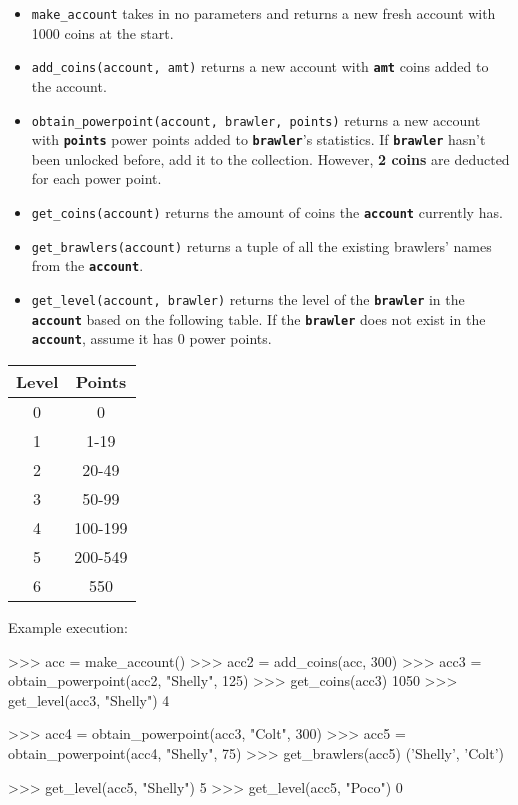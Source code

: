 \begin{itemize}
\item \colorbox{CornflowerBlue!20}{\texttt{make\_account}} takes in no parameters and returns a new fresh account with 1000 coins at the start.
\item \colorbox{CornflowerBlue!20}{\texttt{add\_coins(account, amt)}} returns a new account with \texttt{\bfseries amt} coins added to the account.
\item \colorbox{CornflowerBlue!20}{\texttt{obtain\_powerpoint(account, brawler, points)}} returns a new account with \texttt{\bfseries points} power 
points added to \texttt{\bfseries brawler}'s statistics. If \texttt{\bfseries brawler} hasn't been unlocked before, add it to the collection. 
However, \textbf{2 coins} are deducted for each power point.
\item \colorbox{CornflowerBlue!20}{\texttt{get\_coins(account)}} returns the amount of coins the \texttt{\bfseries account} currently has.
\item \colorbox{CornflowerBlue!20}{\texttt{get\_brawlers(account)}} returns a tuple of all the existing brawlers' names from the \texttt{\bfseries account}.
\item \colorbox{CornflowerBlue!20}{\texttt{get\_level(account, brawler)}} returns the level of the \texttt{\bfseries brawler} in the 
\texttt{\bfseries account} based on the following table. If the \texttt{\bfseries brawler} does not exist in the \texttt{\bfseries account}, assume it has 
0 power points.
\end{itemize}

\begin{center}
\begin{tabular}{||c|c||} 
\hline
\textbf{Level} & \textbf{Points} \\ [0.5ex] 
\hline\hline
0 & 0 \\ 
\hline
1 & 1-19 \\ 
\hline
2 & 20-49 \\
\hline
3 & 50-99 \\
\hline
4 & 100-199 \\
\hline
5 & 200-549 \\
\hline
6 & 550 \\
\hline
\end{tabular}
\end{center}

Example execution:
\begin{python}
>>> acc = make_account()
>>> acc2 = add_coins(acc, 300)
>>> acc3 = obtain_powerpoint(acc2, "Shelly", 125)
>>> get_coins(acc3)
1050
>>> get_level(acc3, "Shelly")
4

>>> acc4 = obtain_powerpoint(acc3, "Colt", 300)
>>> acc5 = obtain_powerpoint(acc4, "Shelly", 75)
>>> get_brawlers(acc5)
('Shelly', 'Colt')

>>> get_level(acc5, "Shelly")
5
>>> get_level(acc5, "Poco")
0
\end{python}

